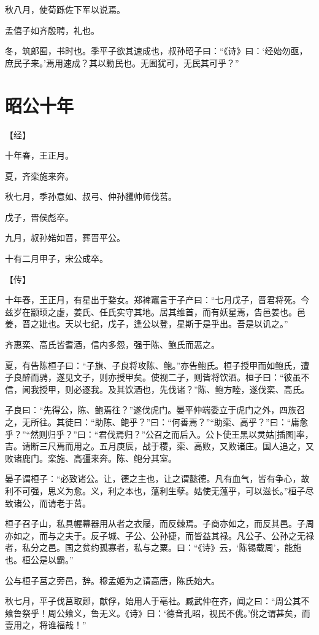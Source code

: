 \documentclass[a4paper,12pt,UTF8,twoside]{ctexbook}
\begin{document}
秋八月，使荀跞佐下军以说焉。

孟僖子如齐殷聘，礼也。

冬，筑郎囿，书时也。季平子欲其速成也，叔孙昭子曰：“《诗》曰：‘经始勿亟，庶民子来。’焉用速成？其以勦民也。无囿犹可，无民其可乎？”

\chapter{昭公十年}



【经】

十年春，王正月。

夏，齐栾施来奔。

秋七月，季孙意如、叔弓、仲孙貜帅师伐莒。

戊子，晋侯彪卒。

九月，叔孙婼如晋，葬晋平公。

十有二月甲子，宋公成卒。

【传】

十年春，王正月，有星出于婺女。郑裨竈言于子产曰：“七月戊子，晋君将死。今兹岁在颛顼之虚，姜氏、任氏实守其地。居其维首，而有妖星焉，告邑姜也。邑姜，晋之妣也。天以七纪，戊子，逢公以登，星斯于是乎出。吾是以讥之。”

齐惠栾、高氏皆耆酒，信内多怨，强于陈、鲍氏而恶之。

夏，有告陈桓子曰：“子旗、子良将攻陈、鲍。”亦告鲍氏。桓子授甲而如鲍氏，遭子良醉而骋，遂见文子，则亦授甲矣。使视二子，则皆将饮酒。桓子曰：“彼虽不信，闻我授甲，则必逐我。及其饮酒也，先伐诸？”陈、鲍方睦，遂伐栾、高氏。

子良曰：“先得公，陈、鲍焉往？”遂伐虎门。晏平仲端委立于虎门之外，四族召之，无所往。其徒曰：“助陈、鲍乎？”曰：“何善焉？”“助栾、高乎？”曰：“庸愈乎？”“然则归乎？”曰：“君伐焉归？”公召之而后入。公卜使王黑以灵姑[插图]率，吉。请断三尺焉而用之。五月庚辰，战于稷，栾、高败，又败诸庄。国人追之，又败诸鹿门。栾施、高彊来奔。陈、鲍分其室。

晏子谓桓子：“必致诸公。让，德之主也，让之谓懿德。凡有血气，皆有争心，故利不可强，思义为愈。义，利之本也，蕰利生孽。姑使无蕰乎，可以滋长。”桓子尽致诸公，而请老于莒。

桓子召子山，私具幄幕器用从者之衣屦，而反棘焉。子商亦如之，而反其邑。子周亦如之，而与之夫于。反子城、子公、公孙捷，而皆益其禄。凡公子、公孙之无禄者，私分之邑。国之贫约孤寡者，私与之粟。曰：“《诗》云，‘陈锡载周’，能施也。桓公是以霸。”

公与桓子莒之旁邑，辞。穆孟姬为之请高唐，陈氏始大。

秋七月，平子伐莒取郠，献俘，始用人于亳社。臧武仲在齐，闻之曰：“周公其不飨鲁祭乎！周公飨义，鲁无义。《诗》曰：‘德音孔昭，视民不佻。’佻之谓甚矣，而壹用之，将谁福哉！”
\end{document}
